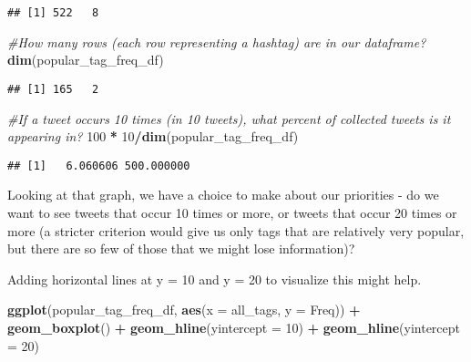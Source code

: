 \documentclass[]{article}
\newenvironment{Shaded}{\begin{snugshade}}{\end{snugshade}}
\newcommand{\CommentTok}[1]{\textcolor[rgb]{0.56,0.35,0.01}{\textit{#1}}}
\newcommand{\DataTypeTok}[1]{\textcolor[rgb]{0.13,0.29,0.53}{#1}}
\newcommand{\DecValTok}[1]{\textcolor[rgb]{0.00,0.00,0.81}{#1}}
\newcommand{\KeywordTok}[1]{\textcolor[rgb]{0.13,0.29,0.53}{\textbf{#1}}}
\newcommand{\NormalTok}[1]{#1}
\newcommand{\OperatorTok}[1]{\textcolor[rgb]{0.81,0.36,0.00}{\textbf{#1}}}
\newcommand{\StringTok}[1]{\textcolor[rgb]{0.31,0.60,0.02}{#1}}
\begin{document}
\begin{verbatim}
## [1] 522   8
\end{verbatim}

\begin{Shaded}
\begin{Highlighting}[]
\CommentTok{#How many rows (each row representing a hashtag) are in our dataframe?}
\KeywordTok{dim}\NormalTok{(popular_tag_freq_df)}
\end{Highlighting}
\end{Shaded}

\begin{verbatim}
## [1] 165   2
\end{verbatim}

\begin{Shaded}
\begin{Highlighting}[]
\CommentTok{#If a tweet occurs 10 times (in 10 tweets), what percent of collected tweets is it appearing in?}
\DecValTok{100} \OperatorTok{*}\StringTok{ }\DecValTok{10}\OperatorTok{/}\KeywordTok{dim}\NormalTok{(popular_tag_freq_df)}
\end{Highlighting}
\end{Shaded}

\begin{verbatim}
## [1]   6.060606 500.000000
\end{verbatim}

Looking at that graph, we have a choice to make about our priorities -
do we want to see tweets that occur 10 times or more, or tweets that
occur 20 times or more (a stricter criterion would give us only tags
that are relatively very popular, but there are so few of those that we
might lose information)?

Adding horizontal lines at y = 10 and y = 20 to visualize this might
help.

\begin{Shaded}
\begin{Highlighting}[]
\KeywordTok{ggplot}\NormalTok{(popular_tag_freq_df, }\KeywordTok{aes}\NormalTok{(}\DataTypeTok{x =}\NormalTok{ all_tags, }\DataTypeTok{y =}\NormalTok{ Freq)) }\OperatorTok{+}
\StringTok{  }\KeywordTok{geom_boxplot}\NormalTok{() }\OperatorTok{+}\StringTok{ }\KeywordTok{geom_hline}\NormalTok{(}\DataTypeTok{yintercept =} \DecValTok{10}\NormalTok{) }\OperatorTok{+}\StringTok{ }\KeywordTok{geom_hline}\NormalTok{(}\DataTypeTok{yintercept =} \DecValTok{20}\NormalTok{)}
\end{Highlighting}
\end{Shaded}
\end{document}
